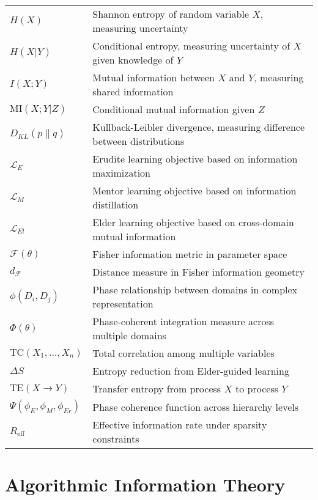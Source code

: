 \begin{tabular}{p{3cm} p{12cm}}
$H(X)$ & Shannon entropy of random variable $X$, measuring uncertainty \\
$H(X|Y)$ & Conditional entropy, measuring uncertainty of $X$ given knowledge of $Y$ \\
$I(X;Y)$ & Mutual information between $X$ and $Y$, measuring shared information \\
$\text{MI}(X;Y|Z)$ & Conditional mutual information given $Z$ \\
$D_{KL}(p \| q)$ & Kullback-Leibler divergence, measuring difference between distributions \\
$\mathcal{L}_E$ & Erudite learning objective based on information maximization \\
$\mathcal{L}_M$ & Mentor learning objective based on information distillation \\
$\mathcal{L}_{El}$ & Elder learning objective based on cross-domain mutual information \\
$\mathcal{F}(\theta)$ & Fisher information metric in parameter space \\
$d_{\mathcal{F}}$ & Distance measure in Fisher information geometry \\
$\phi(D_i, D_j)$ & Phase relationship between domains in complex representation \\
$\Phi(\theta)$ & Phase-coherent integration measure across multiple domains \\
$\text{TC}(X_1,...,X_n)$ & Total correlation among multiple variables \\
$\Delta S$ & Entropy reduction from Elder-guided learning \\
$\text{TE}(X \rightarrow Y)$ & Transfer entropy from process $X$ to process $Y$ \\
$\Psi(\phi_E, \phi_M, \phi_{Er})$ & Phase coherence function across hierarchy levels \\
$R_{\text{eff}}$ & Effective information rate under sparsity constraints \\
\end{tabular}

\newpage
\section*{Algorithmic Information Theory}

